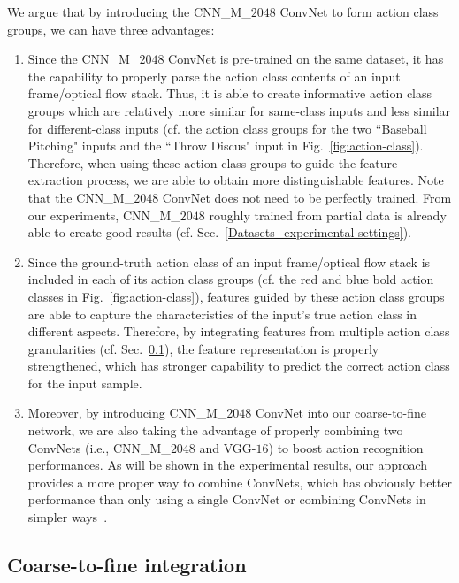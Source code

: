 \documentclass[letterpaper]{article}
\begin{document}
We argue that by introducing the CNN\_M\_$2048$ ConvNet to form action class groups, we can have three advantages:

\begin{enumerate}
 \item Since the CNN\_M\_$2048$ ConvNet is pre-trained on the same dataset, it has the capability to properly parse the action class contents of an input frame/optical flow stack. Thus, it is able to create informative action class groups which are relatively more similar for same-class inputs and less similar for different-class inputs (cf. the action class groups for the two ``Baseball Pitching" inputs and the ``Throw Discus" input in Fig.~\ref{fig:action-class}). Therefore, when using these action class groups to guide the feature extraction process, we are able to obtain more distinguishable features. Note that the CNN\_M\_$2048$ ConvNet does not need to be perfectly trained. From our experiments, CNN\_M\_$2048$  roughly trained from partial data is already able to create good results (cf. Sec.~\ref{Datasets_experimental settings}).
 \item Since the ground-truth action class of an input frame/optical flow stack is included in each of its action class groups (cf. the red and blue bold action classes in Fig.~\ref{fig:action-class}), features guided by these action class groups are able to capture the characteristics of the input's true action class in different aspects. Therefore, by integrating features from multiple action class granularities (cf. Sec.~\ref{integration}), the feature representation is properly strengthened, which has stronger capability to predict the correct action class for the input sample. %

 \item Moreover, by introducing CNN\_M\_$2048$ ConvNet into our coarse-to-fine network, we are also taking the advantage of properly combining two ConvNets (i.e., CNN\_M\_$2048$ and VGG-$16$) to boost action recognition performances. As will be shown in the experimental results, our approach provides a more proper way to combine ConvNets, which has obviously better performance than only using a single ConvNet or combining ConvNets in simpler ways~\cite{twocnn,twocnn2}.

\end{enumerate}


\subsection{Coarse-to-fine integration}\label{integration}
\end{document}
